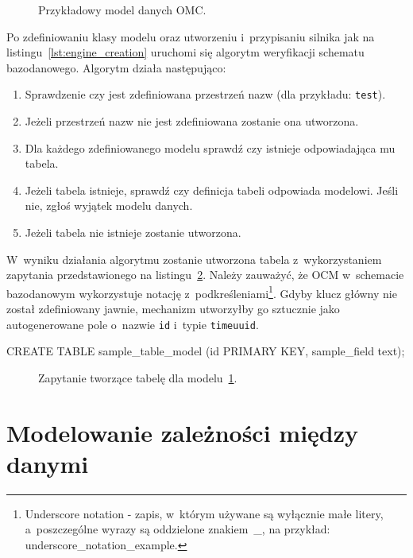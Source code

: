\begin{figure}[ht!]
	\centering
	\theverbbox
	\caption{Przykładowy model danych OMC.}
	\label{lst:sample_model}
\end{figure}

Po zdefiniowaniu klasy modelu oraz utworzeniu i~przypisaniu silnika jak na listingu~\ref{lst:engine_creation} uruchomi się algorytm weryfikacji schematu bazodanowego. Algorytm działa następująco:

\begin{enumerate}
	\item Sprawdzenie czy jest zdefiniowana przestrzeń nazw (dla przykładu: \verb+test+). 
	\item Jeżeli przestrzeń nazw nie jest zdefiniowana zostanie ona utworzona.
	\item Dla każdego zdefiniowanego modelu sprawdź czy istnieje odpowiadająca mu tabela.
	\item Jeżeli tabela istnieje, sprawdź czy definicja tabeli odpowiada modelowi. Jeśli nie, zgłoś wyjątek modelu danych.
	\item Jeżeli tabela nie istnieje zostanie utworzona.
\end{enumerate} 

W~wyniku działania algorytmu zostanie utworzona tabela z~wykorzystaniem zapytania przedstawionego na listingu~\ref{lst:sample_model_create_query}. Należy zauważyć, że OCM w~schemacie bazodanowym wykorzystuje notację z~podkreśleniami\footnote{Underscore notation - zapis, w~którym używane są wyłącznie małe litery, a~poszczególne wyrazy są oddzielone znakiem~\_, na przykład: underscore\_notation\_example.}. Gdyby klucz główny nie został zdefiniowany jawnie, mechanizm utworzyłby go sztucznie jako autogenerowane pole o~nazwie \verb+id+ i~typie \verb+timeuuid+.

\begin{verbbox}[\footnotesize]
CREATE TABLE sample_table_model (id PRIMARY KEY, sample_field text);
\end{verbbox}

\begin{figure}[ht!]
	\centering
	\theverbbox
	\caption{Zapytanie tworzące tabelę dla modelu~\ref{lst:sample_model}.}
	\label{lst:sample_model_create_query}
\end{figure}

\section{Modelowanie zależności między danymi}
\label{sec:relation_modeling}

